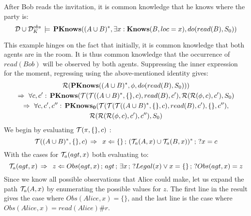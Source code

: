 \begin{example}
After Bob reads the invitation, it is common knowledge that he knows
where the party is:\[
\mathcal{D}\cup\mathcal{D}_{K}^{obs}\,\models\,\mathbf{PKnows}((A\cup B)^{*},\exists x:\mathbf{Knows}(B,loc=x),do(read(B),S_{0}))\]

\end{example}
This example hinges on the fact that initially, it is common knowledge
that both agents are in the room. It is thus common knowledge that
the occurrence of $read(Bob)$ will be observed by both agents. Suppressing
the inner expression for the moment, regressing using the above-mentioned
identity gives:\begin{multline*}
\mathcal{R}(\mathbf{PKnows}((A\cup B)^{*},\phi,do(read(B),S_{0})))\\
\Rightarrow\,\,\forall c,c':\,\mathbf{PKnows}(\mathcal{T}(\mathcal{T}((A\cup B)^{*},\{\},c),read(B),c'),\mathcal{R}(\mathcal{R}(\phi,c),c'),S_{0})\\
\Rightarrow\,\,\forall c,c',c'':\,\mathbf{PKnows_{0}}(\mathcal{T}(\mathcal{T}(\mathcal{T}((A\cup B)^{*},\{\},c),read(B),c'),\{\},c''),\\
\mathcal{R}(\mathcal{R}(\mathcal{R}(\phi,c),c'),c''),S_{0})\end{multline*}
 We begin by evaluating $\mathcal{T}(\pi,\{\},c)$ :\[
\mathcal{T}((A\cup B)^{*},\{\},c)\,\Rightarrow\,\,\, x\Leftarrow\{\}\,;\,(\mathcal{T}_{a}(A,x)\cup\mathcal{T}_{a}(B,x))^{*}\,;\,?x=c\]
 With the cases for $\mathcal{T}_{a}(agt,x)$ both evaluating to:\[
\mathcal{T}_{a}(agt,x)\,\Rightarrow\,\,\, z\Leftarrow Obs(agt,x)\,;\, agt\,;\,\exists x\,;\,?Legal(x)\vee x=\{\}\,;\,?Obs(agt,x)=z\]
 Since we know all possible observations that Alice could make, let
us expand the path $\mathcal{T}_{a}(A,x)$ by enumerating the possible values
for $z$. The first line in the result gives the case where $Obs(Alice,x)=\{\}$,
and the last line is the case where $Obs(Alice,x)=read(Alice)\#r$.
